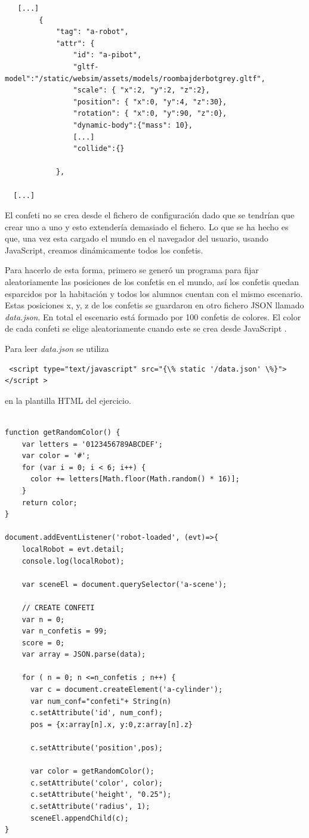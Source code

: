 \begin{lstlisting}
   [...]
        {
            "tag": "a-robot",
            "attr": {
                "id": "a-pibot",
                "gltf-model":"/static/websim/assets/models/roombajderbotgrey.gltf",
                "scale": { "x":2, "y":2, "z":2},
                "position": { "x":0, "y":4, "z":30},
                "rotation": { "x":0, "y":90, "z":0},
                "dynamic-body":{"mass": 10},
                [...]
                "collide":{}

            },
           
  [...]
\end{lstlisting}

El confeti no se crea desde el fichero de configuración dado que se tendrían que crear uno a uno y esto extendería demasiado el fichero. Lo que se ha hecho es que, una vez esta cargado el mundo en el navegador del usuario, usando JavaScript, creamos dinámicamente todos los confetis.

Para hacerlo de esta forma, primero se generó un programa para fijar aleatoriamente las posiciones de los confetis en el mundo, así los confetis quedan esparcidos por la habitación y todos los alumnos cuentan con el mismo escenario. Estas posiciones x, y, z de los confetis se guardaron en otro fichero JSON llamado \textit{data.json}. En total el escenario está formado por 100 confetis de colores. El color de cada confeti se elige aleatoriamente cuando este se crea desde JavaScript .

Para leer \textit{data.json} se utiliza
\begin{lstlisting}
 <script type="text/javascript" src="{\% static '/data.json' \%}"></script > 
 \end{lstlisting}
en la plantilla HTML del ejercicio.

\begin{lstlisting}

function getRandomColor() {
    var letters = '0123456789ABCDEF';
    var color = '#';
    for (var i = 0; i < 6; i++) {
      color += letters[Math.floor(Math.random() * 16)];
    }
    return color;
}

document.addEventListener('robot-loaded', (evt)=>{
    localRobot = evt.detail;
    console.log(localRobot);

    var sceneEl = document.querySelector('a-scene');

    // CREATE CONFETI
    var n = 0;
    var n_confetis = 99;
    score = 0;
    var array = JSON.parse(data);

    for ( n = 0; n <=n_confetis ; n++) {
      var c = document.createElement('a-cylinder');
      var num_conf="confeti"+ String(n)
      c.setAttribute('id', num_conf);
      pos = {x:array[n].x, y:0,z:array[n].z}
    
      c.setAttribute('position',pos);
    
      var color = getRandomColor();
      c.setAttribute('color', color);
      c.setAttribute('height', "0.25");
      c.setAttribute('radius', 1);
      sceneEl.appendChild(c);
}
\end{lstlisting}

